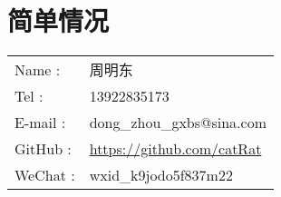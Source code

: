 \section*{简单情况}
\begin{tabular}{ll}
  Name : & 周明东 \\
  Tel : & 13922835173 \\
  E-mail : & dong\_zhou\_gxbs@sina.com \\
  GitHub : & \url{https://github.com/catRat} \\
  WeChat : & wxid\_k9jodo5f837m22
\end{tabular}
